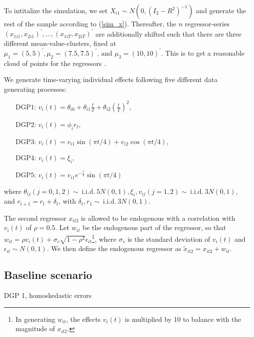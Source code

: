 To intitalize the simulation, we set $X_{i1} \sim N(0, (I_2 - R^2)^{-1})$ and generate the rest of the sample according to (\ref{sim_x}). Thereafter, the $n$ regressor-series $\left(x_{1 i 1}, x_{2 i 1}\right)^{\prime}, \ldots,\left(x_{1 i T}, x_{2 i T}\right)^{\prime}$ are additionally shifted such that there are three different mean-value-clusters, fixed at $ \mu_1=(5,5)^{\prime}, \mu_2=(7.5,7.5)^{\prime} \text {, and } \mu_3=(10,10)^{\prime}$. This is to get a reasonable cloud of points for the regressors \citep{kneip2012new}.

We generate time-varying individual effects following five different data generating processes:
\begin{enumerate}
\item[$\text{DGP}1$:] $v_i(t)=\theta_{i0}+\theta_{i1}\frac{t}{T}+\theta_{i2}\left(\frac{t}{T}\right)^2$,
\item[$\text{DGP}2$:] $v_i(t)=\phi_i r_t$,
\item[$\text{DGP}3$:] $v_i(t)=v_{i1} \sin (\pi t / 4) +v_{i2} \cos (\pi t / 4)$,
\item[$\text{DGP}4$:] $v_i(t)=\xi_i$,
\item[$\text{DGP}5$:] $v_i(t) = v_{i1} e^{-\frac{t}{4}}  \sin (\pi t / 4)$
\end{enumerate}

where $\theta_{i j}(j=0,1,2) \sim \: \text{i.i.d.} \: 5N(0,1),\xi_i, v_{i j}(j=1,2) \sim \: \text{i.i.d.} \: 3N(0,1)$, and $r_{t+1} = r_t + \delta_t$, with $\delta_t, r_1 \sim \: \text{i.i.d.} \: 3N(0,1)$. 

The second regressor $x_{it2}$ is allowed to be endogenous with a correlation with $v_i(t)$ of $\rho = 0.5$. Let $w_{it}$ be the endogenous part of the regressor, so that $w_{it} = \rho v_i(t) + \sigma_v \sqrt{1-\rho^2}\epsilon_{it}$\footnote{In generating $w_{i t}$, the effects $v_i(t)$ is multiplied by 10 to balance with the magnitude of $x_{i t2}$.}, where $\sigma_v$ is the standard deviation of $v_i(t)$ and $\epsilon_{i t} \sim N(0,1)$. We then define the endogenous regressor as $\tilde{x}_{it2} = x_{it2} + w_{it}$.



\subsection{Baseline scenario}


\begin{table}[]
\caption{DGP 1, homoskedastic errors}
    \centering
 
\end{table}
    
